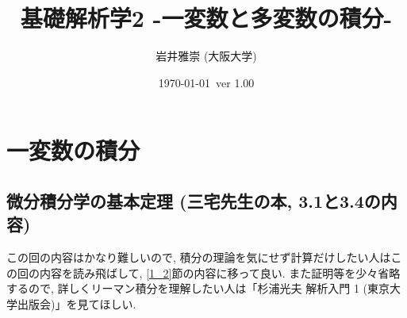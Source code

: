 \documentclass[dvipdfmx,a4paper,11pt]{article}
\title{基礎解析学2 -一変数と多変数の積分-}
\author{岩井雅崇 (大阪大学)}
\date{\today \, ver 1.00}
\theoremstyle{definition}
\begin{document}
\maketitle
\tableofcontents

\section{一変数の積分}

\subsection{微分積分学の基本定理 (三宅先生の本, 3.1と3.4の内容)}
\label{kihonteiri}

 この回の内容はかなり難しいので, 積分の理論を気にせず計算だけしたい人はこの回の内容を読み飛ばして, \ref{1_2}節の内容に移って良い.
 また証明等を少々省略するので, 詳しくリーマン積分を理解したい人は「杉浦光夫 解析入門 1 (東京大学出版会)」を見てほしい.
 
\end{document}
